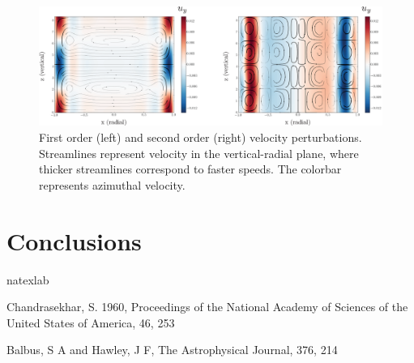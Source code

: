 \documentclass{emulateapj}
\begin{document}
\begin{figure}[h!]
\centering
\includegraphics[scale=0.5]{twoorders_velocity.eps}
\caption{First order (left) and second order (right) velocity perturbations. Streamlines represent velocity in the vertical-radial plane, where thicker streamlines correspond to faster speeds. The colorbar represents azimuthal velocity.}
\end{figure}

\section{Conclusions}

%
%



\begin{thebibliography}{53}
\expandafter\ifx\csname natexlab\endcsname\relax\def\natexlab#1{#1}\fi

Chandrasekhar, S. 1960, Proceedings of the National Academy of Sciences of the United States of America, 46, 253

Balbus, S A and Hawley, J F, The Astrophysical Journal, 376, 214


\end{thebibliography}
\end{document}
